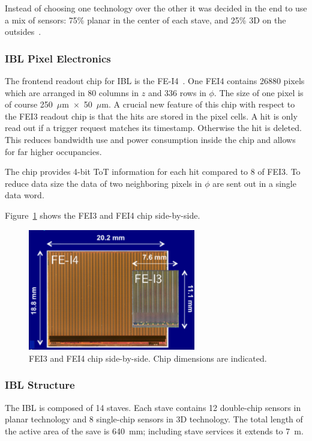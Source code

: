 Instead of choosing one technology over the other it was decided in the end to use a mix of sensors: 75\% planar in the center of each stave, and 25\% 3D on the outsides~\cite{AtlasVertexing2012}.


\subsubsection{IBL Pixel Electronics}

The frontend readout chip for IBL is the FE-I4~\cite{FEI4}. One FEI4 contains 26880 pixels which are arranged in 80 columns in $z$ and 336 rows in $\phi$. The size of one pixel is of course 
250~$\mu$m~$\times$~50~$\mu$m.
A crucial new feature of this chip with respect to the FEI3 readout chip is that the hits are stored in the 
pixel cells. A hit is only read out if a trigger request matches its timestamp. Otherwise the hit is deleted. 
This reduces bandwidth use and power consumption inside the chip and allows for far higher 
occupancies.

The chip provides 4-bit ToT information for each hit compared to 8 of FEI3. To reduce data size the data of two neighboring pixels in $\phi$ are sent out in a single data word.

Figure~\ref{fig:TwoFEIs} shows the FEI3 and FEI4 chip side-by-side.
\begin{figure}[!htpb]
\centering
\includegraphics[width=0.65\textwidth]{TwoFEIs.pdf}
\caption{\label{fig:TwoFEIs}FEI3 and FEI4 chip side-by-side. Chip dimensions are indicated.}
\end{figure}

\subsubsection{IBL Structure}
The IBL is composed of 14 staves.
Each stave contains 12 double-chip sensors in planar technology and 8 single-chip sensors in 3D 
technology. The total length of the active area of the save is 640~mm; including stave services it 
extends to 7~m.

